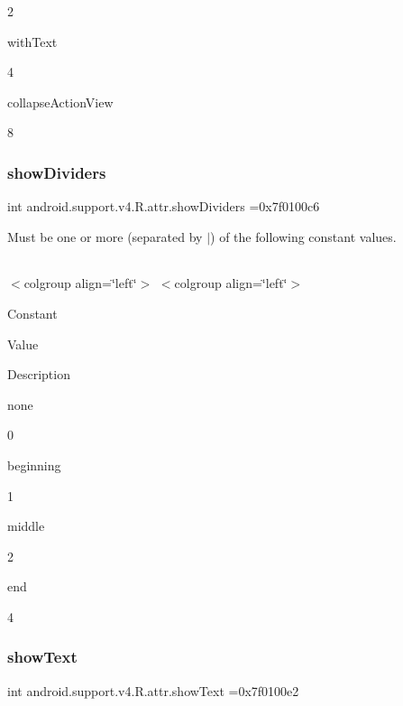 2

{\ttfamily with\+Text}

4

{\ttfamily collapse\+Action\+View}

8\mbox{\label{classandroid_1_1support_1_1v4_1_1R_1_1attr_aa53445a82594ef89d4797d7d7180f8d8}} 
\subsubsection{\texorpdfstring{show\+Dividers}{showDividers}}
{\footnotesize\ttfamily int android.\+support.\+v4.\+R.\+attr.\+show\+Dividers =0x7f0100c6\hspace{0.3cm}{\ttfamily [static]}}

Must be one or more (separated by \textquotesingle{}$\vert$\textquotesingle{}) of the following constant values.

\tabulinesep=1mm
\begin{longtabu} spread 0pt [c]{*{0}{|X[-1]}|}
\hline
\end{longtabu}
$<$colgroup align=\char`\"{}left\char`\"{}$>$ $<$colgroup align=\char`\"{}left\char`\"{}$>$ 

Constant

Value

Description 

{\ttfamily none}

0

{\ttfamily beginning}

1

{\ttfamily middle}

2

{\ttfamily end}

4\mbox{\label{classandroid_1_1support_1_1v4_1_1R_1_1attr_aa0095b9dde80a1ef23701d9b393c5343}} 
\subsubsection{\texorpdfstring{show\+Text}{showText}}
{\footnotesize\ttfamily int android.\+support.\+v4.\+R.\+attr.\+show\+Text =0x7f0100e2\hspace{0.3cm}{\ttfamily [static]}}

